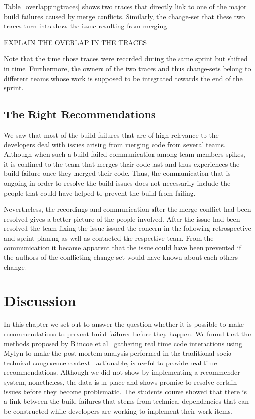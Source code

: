 Table~\ref{overlappingtraces} shows two traces that directly link to one of the major build failures caused by merge conflicts.
Similarly, the change-set that these two traces turn into show the issue resulting from merging.

EXPLAIN THE OVERLAP IN THE TRACES

Note that the time those traces were recorded during the same sprint but shifted in time.
Furthermore, the owners of the two traces and thus change-sets belong to different teams whose work is supposed to be integrated towards the end of the sprint.

\subsection{The Right Recommendations}
We saw that most of the build failures that are of high relevance to the developers deal with issues arising from merging code from several teams.
Although when such a build failed communication among team members spikes, it is confined to the team that merges their code last and thus experiences the build failure once they merged their code.
Thus, the communication that is ongoing in order to resolve the build issues does not necessarily include the people that could have helped to prevent the build from failing.

Nevertheless, the recordings and communication after the merge conflict had been resolved gives a better picture of the people involved.
After the issue had been resolved the team fixing the issue issued the concern in the following retrospective and sprint planing as well as contacted the respective team.
From the communication it became apparent that the issue could have been prevented if the authors of the conflicting change-set would have known about each others change.

\section{Discussion}
In this chapter we set out to answer the question whether it is possible to make recommendations to prevent build failures before they happen.
We found that the methods proposed by Blincoe et al~\cite{} gathering real time code interactions using Mylyn to make the post-mortem analysis performed in the traditional socio-technical congruence context~\cite{} actionable, is useful to provide real time recommendations.
Although we did not show by implementing a recommender system, nonetheless, the data is in place and shows promise to resolve certain issues before they become problematic.
The students course showed that there is a link between the build failures that stems from technical dependencies that can be constructed while developers are working to implement their work items.


